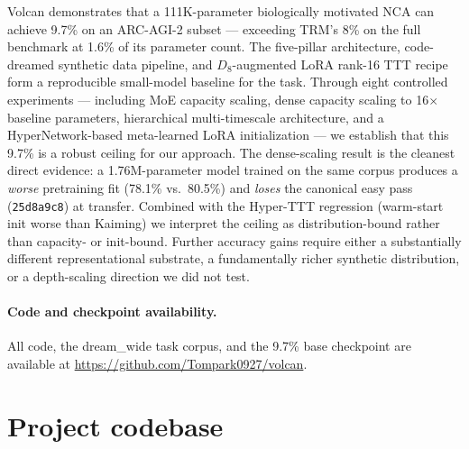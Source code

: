\documentclass[11pt]{article}
\begin{document}
Volcan demonstrates that a 111K-parameter biologically motivated NCA can achieve 9.7\% on an ARC-AGI-2 subset --- exceeding TRM's 8\% on the full benchmark at 1.6\% of its parameter count. The five-pillar architecture, code-dreamed synthetic data pipeline, and $D_8$-augmented LoRA rank-16 TTT recipe form a reproducible small-model baseline for the task. Through eight controlled experiments --- including MoE capacity scaling, dense capacity scaling to 16$\times$ baseline parameters, hierarchical multi-timescale architecture, and a HyperNetwork-based meta-learned LoRA initialization --- we establish that this 9.7\% is a robust ceiling for our approach. The dense-scaling result is the cleanest direct evidence: a 1.76M-parameter model trained on the same corpus produces a \emph{worse} pretraining fit (78.1\% vs.\ 80.5\%) and \emph{loses} the canonical easy pass (\texttt{25d8a9c8}) at transfer. Combined with the Hyper-TTT regression (warm-start init worse than Kaiming) we interpret the ceiling as distribution-bound rather than capacity- or init-bound. Further accuracy gains require either a substantially different representational substrate, a fundamentally richer synthetic distribution, or a depth-scaling direction we did not test.

\paragraph{Code and checkpoint availability.} All code, the dream\_wide task corpus, and the 9.7\% base checkpoint are available at \url{https://github.com/Tompark0927/volcan}.




\appendix

\section{Project codebase}
\end{document}
